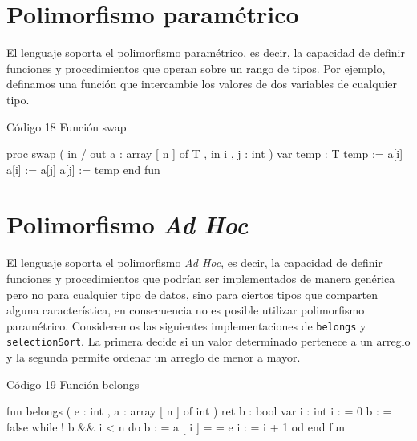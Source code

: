 \section{Polimorfismo paramétrico}
El lenguaje soporta el polimorfismo paramétrico, es decir, la capacidad de definir funciones y procedimientos que operan sobre un rango de tipos. Por ejemplo, definamos una función que intercambie los valores de dos variables de cualquier tipo.

\begin{codebox}{Código 18}
\footnotesize Función swap
\tcblower
\begin{pascallike}
proc swap ( in / out a : array [ n ] of T , in i , j : int )
    var temp : T
    temp := a[i]
    a[i] := a[j] 
    a[j] := temp
end fun
\end{pascallike}
\end{codebox}

\section{Polimorfismo \textit{Ad Hoc}}
El lenguaje soporta el polimorfismo \textit{Ad Hoc}, es decir, la capacidad de definir funciones y procedimientos que podrían ser implementados de manera genérica pero no para cualquier tipo de datos, sino para ciertos tipos que comparten alguna característica, en consecuencia no es posible utilizar polimorfismo paramétrico.
Consideremos las siguientes implementaciones de \texttt{belongs} y \texttt{selectionSort}. La primera decide si un valor determinado pertenece a un arreglo y la segunda permite ordenar un arreglo de menor a mayor.

\begin{codebox}{Código 19}
\footnotesize Función belongs
\tcblower
\begin{pascallike}
fun belongs ( e : int , a : array [ n ] of int ) ret b : bool
var i : int
i : = 0
b : = false
    while ! b && i < n do
        b : = a [ i ] = = e
        i : = i + 1
    od
end fun    
\end{pascallike}
\end{codebox}

